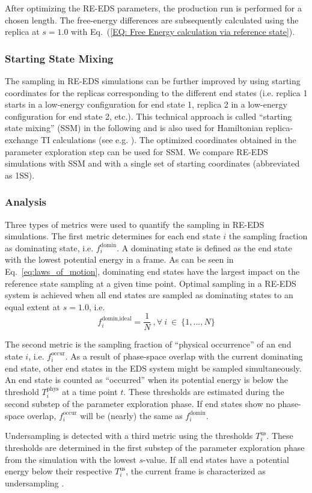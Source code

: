 After optimizing the RE-EDS parameters, the production run is performed for a chosen length. 
The free-energy differences are subsequently calculated using the replica at $s=1.0$ with Eq.~(\ref{EQ: Free Energy calculation via reference state}).

\subsubsection{Starting State Mixing}
The sampling in RE-EDS simulations can be further improved by using starting coordinates for the replicas corresponding to the different end states (i.e. replica 1 starts in a low-energy configuration for end state 1, replica 2 in a low-energy configuration for end state 2, etc.). This technical approach is called ``starting state mixing'' (SSM) in the following and is also used for Hamiltonian replica-exchange TI calculations (see e.g. \cite{Graf2016, Hahn2020}). The optimized coordinates obtained in the parameter exploration step can be used for SSM. We compare RE-EDS simulations with SSM and with a single set of starting coordinates (abbreviated as 1SS).  

\subsubsection{Analysis}
Three types of metrics were used to quantify the sampling in RE-EDS simulations. The first metric determines for each end state $i$ the sampling fraction as dominating state, i.e. $f_i^{\text{domin}}$. A dominating state is defined as the end state with the lowest potential energy in a frame. As can be seen in  Eq.~\eqref{eq:laws_of_motion}, dominating end states have the largest impact on the reference state sampling at a given time point.
%
Optimal sampling in a RE-EDS system is achieved when all end states are sampled as dominating states to an equal extent at $s=1.0$, i.e. 
\begin{equation}
f_{i}^{\text{domin,ideal}} = \frac{1}{N} ~, \forall ~ i~\in~ \{1, ..., N\}
\label{eq: optimalDominationSamplingDist}
\end{equation}

The second metric is the sampling fraction of ``physical occurrence'' of an end state $i$, i.e. $f_i^{\text{occur}}$. As a result of phase-space overlap with the current dominating end state, other end states in the EDS system might be sampled simultaneously. An end state is counted as ``occurred'' when its potential energy is below the threshold $T_{i}^{\text{phys}}$ at a time point $t$. 
These thresholds are estimated during the second substep of the parameter exploration phase. If end states show no phase-space overlap, $f_i^{\text{occur}}$ will be (nearly) the same as $f_i^{\text{domin}}$. 

Undersampling is detected with a third metric using the thresholds $T_{i}^{\text{us}}$. These thresholds are determined in the first substep of the parameter exploration phase from the simulation with the lowest $s$-value. If all end states have a potential energy below their respective $T_{i}^{\text{us}}$, the current frame is characterized as undersampling \cite{Sidler2016}. 